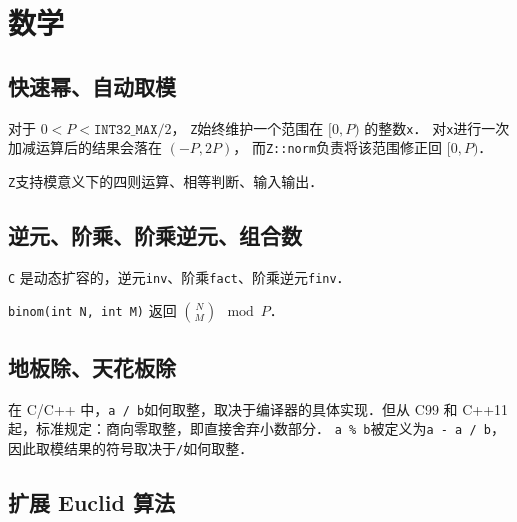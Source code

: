 ﻿\section{数学}

\subsection{快速幂、自动取模}

对于 $0 < P < \mathtt{INT32\_MAX} / 2$，
{\tt Z}始终维护一个范围在 $[0, P)$ 的整数{\tt x}．
对{\tt x}进行一次加减运算后的结果会落在 $(-P, 2P)$，
而{\tt Z::norm}负责将该范围修正回 $[0, P)$．

{\tt Z}支持模意义下的四则运算、相等判断、输入输出．



\newpage

\subsection{逆元、阶乘、阶乘逆元、组合数}

{\tt C} 是动态扩容的，逆元{\tt inv}、阶乘{\tt fact}、阶乘逆元{\tt finv}．

{\tt binom(int N, int M)} 返回 $\binom{N}{M} \mod P$．



\subsection{地板除、天花板除}

在 C/C++ 中，{\tt a / b}如何取整，取决于编译器的具体实现．但从 C99 和 C++11 起，标准规定：商向零取整，即直接舍弃小数部分．
{\tt a \% b}被定义为{\tt a - a / b}，因此取模结果的符号取决于{\tt /}如何取整．



\newpage

\subsection{扩展 Euclid 算法}

